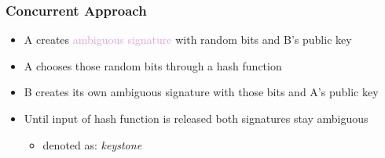 \begin{frame}
	\frametitle{Concurrent Approach}
	
	\begin{itemize}[<+->]
		\setlength\itemsep{1em}
		\item A creates \textcolor{Plum}{ambiguous signature} with random bits and B's public key
		\item A chooses those random bits through a hash function
		\item B creates its own ambiguous signature with those bits and A's public key
		\item Until input of hash function is released both signatures stay ambiguous
			\begin{itemize}
				\item denoted as: \textit{keystone}
			\end{itemize}
	\end{itemize}
\end{frame}